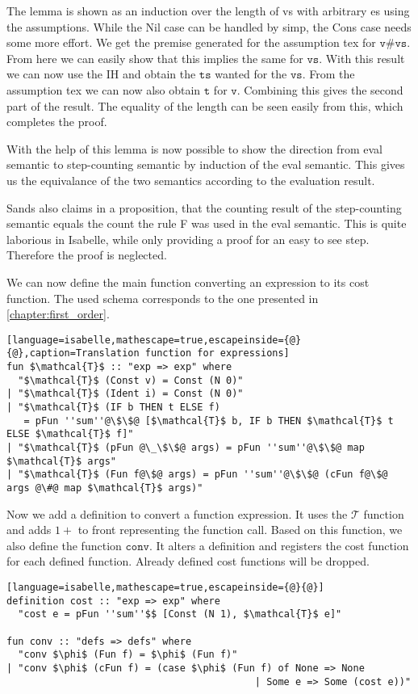 The lemma is shown as an induction over the length of vs with arbitrary es using the assumptions.
While the Nil case can be handled by simp, the Cons case needs some more effort.
We get the premise generated for the assumption tex for $\texttt{v\#vs}$.
From here we can easily show that this implies the same for $\texttt{vs}$.
With this result we can now use the IH and obtain the $\texttt{ts}$ wanted for the $\texttt{vs}$.
From the assumption tex we can now also obtain $\texttt{t}$ for $\texttt{v}$.
Combining this gives the second part of the result.
The equality of the length can be seen easily from this, which completes the proof.

With the help of this lemma is now possible to show the direction from eval semantic to step-counting semantic by induction of the eval semantic.
This gives us the equivalance of the two semantics according to the evaluation result.

Sands also claims in a proposition, that the counting result of the step-counting semantic equals the count the rule F was used in the eval semantic.
This is quite laborious in Isabelle, while only providing a proof for an easy to see step.
Therefore the proof is neglected.

We can now define the main function converting an expression to its cost function.
The used schema corresponds to the one presented in \ref{chapter:first_order}.
\begin{lstlisting}[language=isabelle,mathescape=true,escapeinside={@}{@},caption=Translation function for expressions]
fun $\mathcal{T}$ :: "exp => exp" where
  "$\mathcal{T}$ (Const v) = Const (N 0)"
| "$\mathcal{T}$ (Ident i) = Const (N 0)"
| "$\mathcal{T}$ (IF b THEN t ELSE f)
   = pFun ''sum''@\$\$@ [$\mathcal{T}$ b, IF b THEN $\mathcal{T}$ t ELSE $\mathcal{T}$ f]"
| "$\mathcal{T}$ (pFun @\_\$\$@ args) = pFun ''sum''@\$\$@ map $\mathcal{T}$ args"
| "$\mathcal{T}$ (Fun f@\$@ args) = pFun ''sum''@\$\$@ (cFun f@\$@ args @\#@ map $\mathcal{T}$ args)"
\end{lstlisting}

Now we add a definition to convert a function expression.
It uses the $\mathcal{T}$ function and adds $1+$ to front representing the function call.
Based on this function, we also define the function $\texttt{conv}$.
It alters a definition and registers the cost function for each defined function.
Already defined cost functions will be dropped.
\begin{lstlisting}[language=isabelle,mathescape=true,escapeinside={@}{@}]
definition cost :: "exp => exp" where
  "cost e = pFun ''sum''$$ [Const (N 1), $\mathcal{T}$ e]"

fun conv :: "defs => defs" where
  "conv $\phi$ (Fun f) = $\phi$ (Fun f)"
| "conv $\phi$ (cFun f) = (case $\phi$ (Fun f) of None => None
                                           | Some e => Some (cost e))"
\end{lstlisting}

